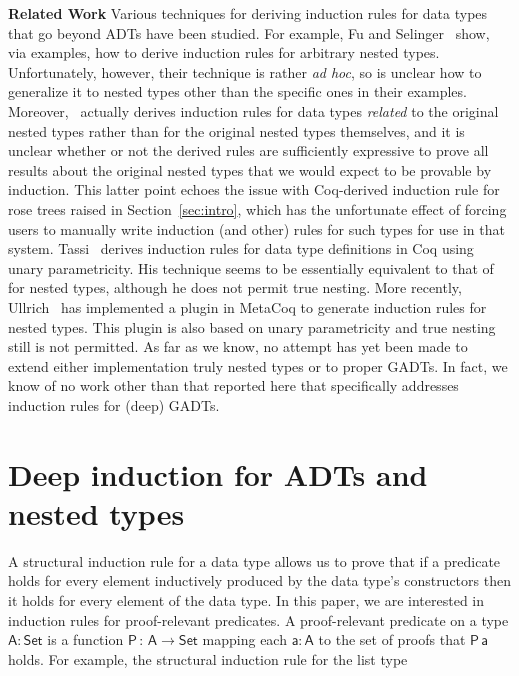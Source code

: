\documentclass[9pt]{entcs}
\begin{document}
\vspace*{0.05in}

{\bf Related Work\/} Various techniques for deriving induction rules
for data types that go beyond ADTs have been studied. For example, Fu
and Selinger~\cite{fs18} show, via examples, how to derive induction
rules for arbitrary nested types. Unfortunately, however, their
technique is rather {\em ad hoc}, so is unclear how to generalize it
to nested types other than the specific ones in their
examples. Moreover,~\cite{fs18} actually derives induction rules for
data types {\em related} to the original nested types rather than for
the original nested types themselves, and it is unclear whether or not
the derived rules are sufficiently expressive to prove all results
about the original nested types that we would expect to be provable by
induction. This latter point echoes the issue with Coq-derived
induction rule for rose trees raised in Section~\ref{sec:intro}, which
has the unfortunate effect of forcing users to manually write
induction (and other) rules for such types for use in that
system. Tassi~\cite{tas19} derives induction rules for data type
definitions in Coq using unary parametricity. His technique seems to
be essentially equivalent to that of~\cite{jp19} for nested types,
although he does not permit true nesting. More recently,
Ullrich~\cite{ull20} has implemented a plugin in MetaCoq to generate
induction rules for nested types. This plugin is also based on unary
parametricity and true nesting still is not permitted.  As far as we
know, no attempt has yet been made to extend either implementation
truly nested types or to proper GADTs. In fact, we know of no work
other than that reported here that specifically addresses induction
rules for (deep) GADTs.

\section{Deep induction for ADTs and nested types}\label{sec:ADTs-and-nesteds}

A structural induction rule for a data type allows us to prove that if
a predicate holds for every element inductively produced by the data
type's constructors then it holds for every element of the data type.
In this paper, we are interested in induction rules for proof-relevant
predicates.  A proof-relevant predicate on a type $\mathsf{A : Set}$
is a function $\mathsf{P\,:\,A \to Set}$ mapping each $\mathsf{a : A}$
to the set of proofs that $\mathsf{P\,a}$ holds.  For example, the
structural induction rule for the list type
\end{document}
